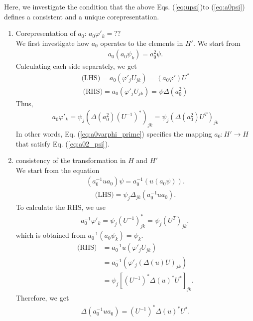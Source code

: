 \documentclass{article}
\begin{document}
Here, we investigate the condition that the above Eqs. (\ref{eq:upsi})to (\ref{eq:a0psi}) defines a consistent and a unique corepresentation.
\begin{enumerate}
  \item Corepresentation of $a_0$: $a_0 \varphi'_k=??$\\
  We first investigate how $a_0$ operates to the elements in $H'$. We start from 
  \begin{align}
    a_0(a_0 \psi_k) = a_0^2 \psi. 
    \label{eq:a02_psi}
  \end{align}
  Calculating each side separately, we get\\
  \begin{align}
    \text{(LHS)} = a_0 (\varphi'_j U_{jk}) = (a_0 \varphi') U^*
  \end{align}
  \begin{align}
    \text{(RHS)} = a_0 (\varphi'_j U_{jk}) = \psi \Delta(a_0^2)
  \end{align}
  Thus,
  \begin{align}
    a_0 \varphi'_k = \psi_j (\Delta (a_0^2) (U^{-1})^*)_{jk} = \psi_j (\Delta (a_0^2) U^{T})_{jk}
    \label{eq:a0varphi_prime}
  \end{align}
  In other words, Eq. (\ref{eq:a0varphi_prime}) specifies the mapping $a_0: H' \to H$ that satisfy Eq. (\ref{eq:a02_psi}).
  \item consistency of the transformation in $H$ and $H'$\\
  We start from the equation 
  \begin{align}
    (a_0^{-1} u a_0 ) \psi = a_0^{-1}(u (a_0 \psi)).
    \label{eq:consistency_transf_HHprime}
  \end{align}
  \begin{align}
    \text{(LHS)} = \psi_j \Delta_{jk}(a_0^{-1} u a_0).
  \end{align}
  To calculate the RHS, we use 
  \begin{align}
    a_0^{-1} \varphi'_k = \psi_j (U^{-1})^*_{jk} = \psi_j (U^{T})_{jk}, 
    \label{eq:inversea0_varphi}
  \end{align}
  which is obtained from $a_0^{-1} (a_0 \psi_k) = \psi_k$.
  \begin{align}
    \text{(RHS)} &= 
    a_0^{-1} u (\varphi'_j U_{jk}) 
    \nonumber
    \\&
    = a_0^{-1} (\varphi'_j (\Delta(u)U)_{jk})
    \nonumber
    \\&=
    \psi_j [(U^{-1})^* \Delta(u)^* U^*]_{jk}.
  \end{align}
  Therefore, we get
  \begin{align}
    \Delta(a_0^{-1} u a_0) = (U^{-1})^* \Delta(u)^* U^*.
    \label{eq:Delta_am1ua}
  \end{align}
\end{enumerate}
\end{document}

